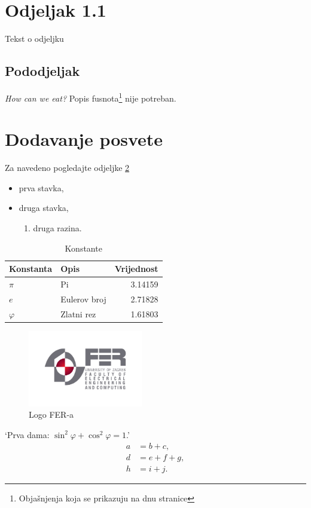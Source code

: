 \documentclass[times, utf8, diplomski]{fer}
\begin{document}
\section{Odjeljak 1.1}
Tekst o odjeljku
\subsection{Pododjeljak}
\emph{How can we eat?}
Popis fusnota\footnote{Objašnjenja koja se prikazuju
na dnu stranice} nije potreban.
\section{Dodavanje posvete}
\label{sec:posveta}
Za navedeno pogledajte odjeljke \ref{sec:posveta}
\begin{itemize}
	\item prva stavka,
	\item druga stavka,
	\begin{enumerate}
		\item druga razina.
	\end{enumerate}
\end{itemize}

\begin{table}[htb]
\caption{Konstante}
\label{tbl:konstante}
\centering
\begin{tabular}{llr} \toprule
Konstanta & Opis & Vrijednost\\ \midrule
$\pi$ & Pi & 3.14159 \\
$e$ & Eulerov broj & 2.71828 \\
$\varphi$ & Zlatni rez & 1.61803 \\ \bottomrule
\end{tabular}
\end{table}

\begin{figure}[htb]
\centering
\includegraphics[width=5cm]{img/fer_logo.jpg}
\caption{Logo FER-a}
\label{fig:fer-logo}
\end{figure}

‘Prva dama: $\sin^2 \varphi + \cos^2 \varphi = 1$.’ \citep{ungar2002uvod} \cite{oetiket2007lshort}
\begin{align}
a&=b+c,\label{eq:a}\\
d&=e+f+g,\\
h&=i+j.\label{eq:h}
\end{align}
\end{document}
